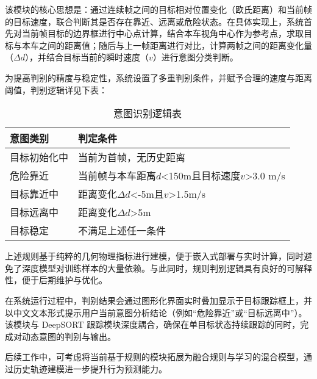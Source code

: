 该模块的核心思想是：通过连续帧之间的目标相对位置变化（欧氏距离）和当前帧的目标速度，联合判断其是否存在靠近、远离或危险状态。在具体实现上，系统首先对当前帧目标的边界框进行中心点计算，结合本车视角中心作为参考点，求取目标与本车之间的距离值；随后与上一帧距离进行对比，计算两帧之间的距离变化量（$\Delta d$），并结合目标当前的瞬时速度（$v$）进行意图分类判断。

为提高判别的精度与稳定性，系统设置了多重判别条件，并赋予合理的速度与距离阈值，判别逻辑详见下表：

\begin{table}[htbp]
  \caption{意图识别逻辑表}
  \label{tab:timetable}
  \centering
  \begin{tabular}{ll}
    \toprule
    意图类别 & 判定条件 \\
    \midrule
    目标初始化中 & 当前为首帧，无历史距离 \\
    危险靠近 & 当前帧与本车距离$d$<150m且目标速度$v$>3.0 m/s \\
    目标靠近中 & 距离变化$\Delta d$<-5m且$v$>1.5m/s \\
    目标远离中 & 距离变化$\Delta d$>5m \\
    目标稳定 & 不满足上述任一条件 \\
    \bottomrule
  \end{tabular}
\end{table}

上述规则基于纯粹的几何物理指标进行建模，便于嵌入式部署与实时计算，同时避免了深度模型对训练样本的大量依赖。与此同时，规则判别逻辑具有良好的可解释性，便于后期维护与优化。

在系统运行过程中，判别结果会通过图形化界面实时叠加显示于目标跟踪框上，并以中文文本形式提示用户当前意图分析结论（例如“危险靠近”或“目标远离中”）。该模块与 DeepSORT 跟踪模块深度耦合，确保在单目标状态持续跟踪的同时，完成对动态意图的判别与输出。

后续工作中，可考虑将当前基于规则的模块拓展为融合规则与学习的混合模型，通过历史轨迹建模进一步提升行为预测能力。



\begin{tabular}{l l}
\end{tabular}
